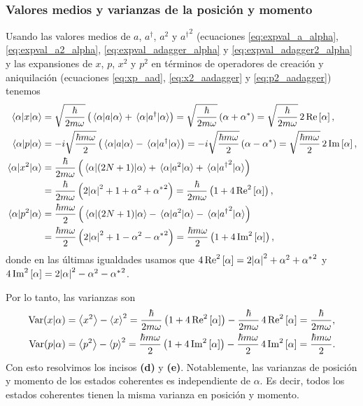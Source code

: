 \documentclass[10pt, a4paper]{article}
\newcommand{\xprefactsq}{\frac{\hbar}{2m\omega}}
\newcommand{\xprefact}{\sqrt{\xprefactsq}}
\newcommand{\pprefactsq}{\frac{\hbar m \omega}{2}}
\newcommand{\pprefact}{\sqrt{\pprefactsq}}
\newcommand{\N}{N}
\numberwithin{equation}{subsection}
\begin{document}
\subsubsection{Valores medios y varianzas de la posición y momento}

Usando las valores medios de $a$, $a^\dagger$, $a^2$ y ${a^\dagger}^2$
(ecuaciones \eqref{eq:expval_a_alpha}, \eqref{eq:expval_a2_alpha},
\eqref{eq:expval_adagger_alpha} y \eqref{eq:expval_adagger2_alpha} y las
expansiones de $x$, $p$, $x^2$ y $p^2$ en términos de operadores de creación y
aniquilación (ecuaciones \eqref{eq:xp_aad}, \eqref{eq:x2_aadagger} y
\eqref{eq:p2_aadagger}) tenemos
\begin{align}
  \expval{x}{\alpha} &= \xprefact\left(\expval{a}{\alpha} +
    \expval{a^\dagger}{\alpha}\right) = \xprefact\left(\alpha +
    \conj{\alpha}\right) = \xprefact\,2\Re\left[\alpha\right],
    \label{eq:expval_x_alpha} \\
  \expval{p}{\alpha} &= -i\pprefact\left(\expval{a}{\alpha} -
    \expval{a^\dagger}{\alpha}\right) = -i\pprefact\left(\alpha -
    \conj{\alpha}\right) = \pprefact\,2\Im\left[\alpha\right],
    \label{eq:expval_p_alpha} \\
  \expval{x^2}{\alpha} &= \xprefactsq\left(\expval{(2\N + 1)}{\alpha} +
    \expval{a^2}{\alpha} + \expval{{a^\dagger}^2}{\alpha}\right) \nonumber \\
  &= \xprefactsq\left(2\abs{\alpha}^2 + 1 + \alpha^2 + \conj{\alpha}^2\right)
    = \xprefactsq\left(1 + 4\Re^2\left[\alpha\right]\right), \\
  \expval{p^2}{\alpha} &= \pprefactsq\left(\expval{(2\N + 1)}{\alpha} -
    \expval{a^2}{\alpha} - \expval{{a^\dagger}^2}{\alpha}\right) \nonumber \\
  &= \pprefactsq\left(2\abs{\alpha}^2 + 1 - \alpha^2 - \conj{\alpha}^2\right)
    = \pprefactsq\left(1 + 4\Im^2\left[\alpha\right]\right),
\end{align}
donde en las últimas igualdades usamos que $4\Re^2\left[\alpha\right] =
2\abs{\alpha}^2 + \alpha^2 + {{\alpha}^{*}}^2$ y $4\Im^2\left[\alpha\right] =
2\abs{\alpha}^2 - \alpha^2 - {{\alpha}^{*}}^2$.

Por lo tanto, las varianzas son
\begin{align}
  \Var(x\vert\alpha) &= \expval{x^2} - \expval{x}^2 =
    \xprefactsq\left(1 + 4\Re^2\left[\alpha\right]\right) -
    \xprefactsq\,4\Re^2\left[\alpha\right] =
    \xprefactsq, \\
  \Var(p\vert\alpha) &= \expval{p^2} - \expval{p}^2 =
    \pprefactsq\left(1 + 4\Im^2\left[\alpha\right]\right) -
    \pprefactsq\,4\Im^2\left[\alpha\right] =
    \pprefactsq.
\end{align}
Con esto resolvimos los incisos \textbf{(d)} y \textbf{(e)}.
Notablemente, las varianzas de posición y momento de los estados coherentes es
independiente de $\alpha$. Es decir, todos los estados coherentes tienen la
misma varianza en posición y momento.
\end{document}

